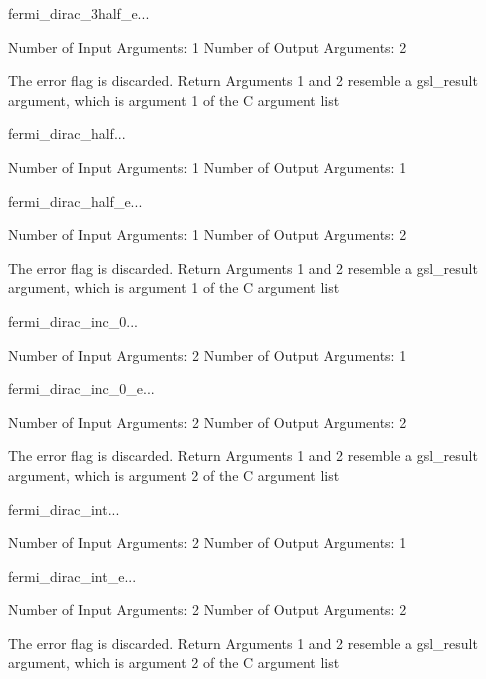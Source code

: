 \begin{funcdesc}{fermi_dirac_3half_e}{...}

    Number of Input  Arguments:  1
    Number of Output Arguments:  2

The error flag is discarded.
Return Arguments 1 and 2 resemble a gsl_result argument,
	which is  argument 1 of the C argument list

\end{funcdesc}

\begin{funcdesc}{fermi_dirac_half}{...}

    Number of Input  Arguments:  1
    Number of Output Arguments:  1
\end{funcdesc}

\begin{funcdesc}{fermi_dirac_half_e}{...}

    Number of Input  Arguments:  1
    Number of Output Arguments:  2

The error flag is discarded.
Return Arguments 1 and 2 resemble a gsl_result argument,
	which is  argument 1 of the C argument list

\end{funcdesc}

\begin{funcdesc}{fermi_dirac_inc_0}{...}

    Number of Input  Arguments:  2
    Number of Output Arguments:  1
\end{funcdesc}

\begin{funcdesc}{fermi_dirac_inc_0_e}{...}

    Number of Input  Arguments:  2
    Number of Output Arguments:  2

The error flag is discarded.
Return Arguments 1 and 2 resemble a gsl_result argument,
	which is  argument 2 of the C argument list

\end{funcdesc}

\begin{funcdesc}{fermi_dirac_int}{...}

    Number of Input  Arguments:  2
    Number of Output Arguments:  1
\end{funcdesc}

\begin{funcdesc}{fermi_dirac_int_e}{...}

    Number of Input  Arguments:  2
    Number of Output Arguments:  2

The error flag is discarded.
Return Arguments 1 and 2 resemble a gsl_result argument,
	which is  argument 2 of the C argument list

\end{funcdesc}

